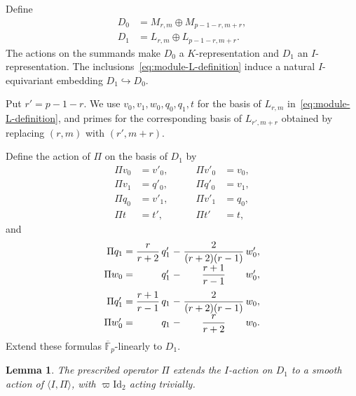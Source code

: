 \documentclass[10pt]{article}
\theoremstyle{plain}
\newtheorem{lemma}[theorem]{Lemma}
\theoremstyle{definition}
\theoremstyle{remark}
\newcommand{\Fpbar}{\overline{\mathbb{F}}_p}
\newcommand{\Id}{\mathrm{Id}}
\begin{document}
Define
\begin{align}
D_0&=M_{r,m}\oplus M_{p-1-r,m+r},\label{eq:D0-definition}\\
D_1&=L_{r,m}\oplus L_{p-1-r,m+r}.\label{eq:D1-definition}
\end{align}
The actions on the summands make $D_0$ a $K$-representation and $D_1$ an $I$-representation. The inclusions~\eqref{eq:module-L-definition} induce a natural $I$-equivariant embedding $D_1\hookrightarrow D_0$. 

Put $r'=p-1-r$. We use $v_0,v_1,w_0,q_0,q_1,t$ for the basis of $L_{r,m}$ in~\eqref{eq:module-L-definition}, and primes for the corresponding basis of $L_{r',m+r}$ obtained by replacing $(r,m)$ with $(r',m+r)$.

Define the action of $\Pi$ on the basis of $D_1$ by
\begin{equation}\label{eq:D1-Pi-exchanges}
\begin{aligned}
\Pi v_0&=v'_0,&\qquad \Pi v'_0&=v_0,\\
\Pi v_1&=q'_0,&\qquad \Pi q'_0&=v_1,\\
\Pi q_0&=v'_1,&\qquad \Pi v'_1&=q_0,\\
\Pi t&=t',&\qquad \Pi t'&=t,
\end{aligned}
\end{equation}
and
\begin{equation}\label{eq:D1-Pi-action}
\renewcommand{\arraystretch}{1.2}
\begin{array}{r@{\;}c@{\;}c@{\,}l@{\;}c@{\;}c@{\,}l}
\Pi q_1 & = & \dfrac{r}{r+2} & q'_1 & - & \dfrac{2}{(r+2)(r-1)} & w'_0,\\[6pt]
\Pi w_0 & = & & q'_1 & - & \dfrac{r+1}{r-1} & w'_0,\\[10pt]
\Pi q'_1 & = & \dfrac{r+1}{r-1} & q_1 & - & \dfrac{2}{(r+2)(r-1)} & w_0,\\[6pt]
\Pi w'_0 & = & & q_1 & - & \dfrac{r}{r+2} & w_0.
\end{array}
\end{equation}
Extend these formulas $\Fpbar$-linearly to $D_1$.

\begin{lemma}\label{lem:D1-Pi-compatible}
The prescribed operator $\Pi$ extends the $I$-action on $D_1$ to a smooth action of $\langle I,\Pi\rangle$, with $\varpi\Id_2$ acting trivially.
\end{lemma}
\end{document}
